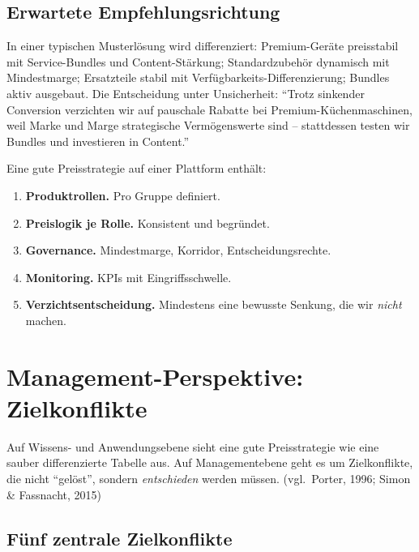 \documentclass[11pt,a4paper,oneside]{article}
\newcommand{\quelle}[1]{{\footnotesize\color{lpGray}(#1)}}
\begin{document}
\subsection{Erwartete Empfehlungsrichtung}

In einer typischen Musterlösung wird differenziert: Premium-Geräte preisstabil mit Service-Bundles und Content-Stärkung; Standardzubehör dynamisch mit Mindestmarge; Ersatzteile stabil mit Verfügbarkeits-Differenzierung; Bundles aktiv ausgebaut. Die Entscheidung unter Unsicherheit: ``Trotz sinkender Conversion verzichten wir auf pauschale Rabatte bei Premium-Küchenmaschinen, weil Marke und Marge strategische Vermögenswerte sind -- stattdessen testen wir Bundles und investieren in Content.''

\begin{merkbox}
Eine gute Preisstrategie auf einer Plattform enthält:
\begin{enumerate}
  \item \textbf{Produktrollen.} Pro Gruppe definiert.
  \item \textbf{Preislogik je Rolle.} Konsistent und begründet.
  \item \textbf{Governance.} Mindestmarge, Korridor, Entscheidungsrechte.
  \item \textbf{Monitoring.} KPIs mit Eingriffsschwelle.
  \item \textbf{Verzichtsentscheidung.} Mindestens eine bewusste Senkung, die wir \emph{nicht} machen.
\end{enumerate}
\end{merkbox}

\section{Management-Perspektive: Zielkonflikte}

Auf Wissens- und Anwendungsebene sieht eine gute Preisstrategie wie eine sauber differenzierte Tabelle aus. Auf Managementebene geht es um Zielkonflikte, die nicht ``gelöst'', sondern \emph{entschieden} werden müssen. \quelle{vgl.\ Porter, 1996; Simon \& Fassnacht, 2015}

\subsection{Fünf zentrale Zielkonflikte}
\end{document}
